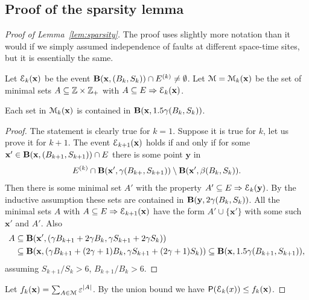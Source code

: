 \documentclass[11pt]{memoir}
\theoremstyle{definition} %
\renewcommand{\le}{\leq}
\renewcommand{\vek}[1]{\mathbf{#1}}
\def\B{B}
\newcommand{\E}{E} %
\renewcommand{\S}{S} %
\newcommand{\x}{\vek{x}} %
\newcommand{\y}{\vek{y}} %
\begin{document}
\subsection{Proof of the sparsity lemma}

\begin{proof}[Proof of Lemma~\ref{lem:sparsity}]
  The proof uses slightly more notation than it would if we simply assumed independence
  of faults at different space-time sites, but it is essentially the same.

  Let \( \cE_{k}(\x) \) be the event  \( \bB(\x,\pair{\B_{k}}{\S_{k}})\cap E^{(k)}\neq\emptyset \).
  Let \( \cM=\cM_{k}(\x) \) be the set of minimal sets \( A\subseteq \mathbb{Z}\times\mathbb{Z}_{+} \)
with  \( A\subseteq E\imp \cE_{k}(\x) \).

  \begin{claim}\label{claim:minimal-set}
    Each set in \( \cM_{k}(\x) \) is contained in \( \bB(\x, 1.5\gamma(\B_{k},\S_{k})) \).
  \end{claim}
  \begin{proof}
    The statement is clearly true for \( k=1 \).
    Suppose it is true for \( k \), let us prove it for \( k+1 \).
    The event \( \cE_{k+1}(\x) \) holds if and only if for
    some \( \x'\in\bB(\x,\pair{\B_{k+1}}{\S_{k+1}})\cap\E \)
    there is some point \( \y \)  in 
\begin{align*}
  E^{(k)}\cap \bB(\x',\gamma(\B_{k+},\S_{k+1}))\setminus \bB(\x',\beta(\B_{k},\S_{k})) .
\end{align*}
    Then there is some minimal set \( A' \) 
    with the property \( A'\subseteq E\imp \cE_{k}(\y) \).
    By the inductive assumption these sets are contained in
    \(  \bB(\y,2\gamma(\B_{k},\S_{k})) \).
    All the minimal sets \( A \) with \( A\subseteq E\imp \cE_{k+1}(\x) \)
have the form \( A'\cup\{\x'\} \) with some such \( \x' \) and \( A' \).
    Also 
\begin{align*}
     A &\subseteq \bB(\x',(\gamma\B_{k+1}+2\gamma\B_{k},\gamma\S_{k+1}+2\gamma\S_{k})) 
\\     &\subseteq \bB(\x,(\gamma\B_{k+1}+(2\gamma+1)\B_{k},\gamma\S_{k+1}+(2\gamma+1)\S_{k})) 
\subseteq \bB(\x, 1.5\gamma(\B_{k+1},\S_{k+1})),
\end{align*}
assuming \( \S_{k+1}/\S_{k}> 6 \), \( \B_{k+1}/\B_{k}> 6 \).
\end{proof}

Let \(  f_{k}(\x)= \sum_{A\in\cM}\eps^{|A|} \).
By the union bound we have \( \Prob(\cE_{k}(x))\le f_{k}(\x) \).


\end{proof}
\end{document}
